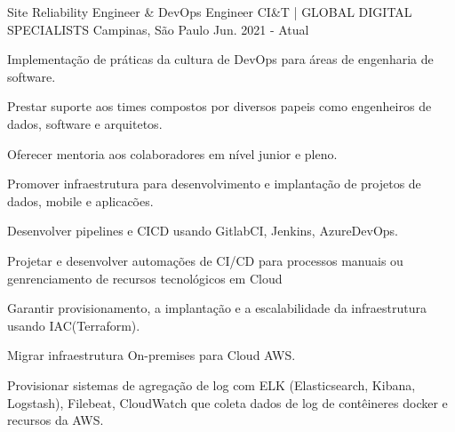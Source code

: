 

\begin{cventries}

  \cventry
    {Site Reliability Engineer \& DevOps Engineer} %
    {CI\&T | GLOBAL DIGITAL SPECIALISTS} %
    {Campinas, São Paulo} %
    {Jun. 2021 - Atual} %
    {
      \begin{cvitems} %
        \item {Implementação de práticas da cultura de DevOps para áreas de engenharia de software.}
        \item {Prestar suporte aos times compostos por diversos papeis como engenheiros de dados, software e arquitetos.}
        \item {Oferecer mentoria aos colaboradores em nível junior e pleno.}
        \item {Promover infraestrutura para desenvolvimento e implantação de projetos de dados, mobile e aplicacões.}
        \item {Desenvolver pipelines e CICD usando GitlabCI, Jenkins, AzureDevOps.}
        \item {Projetar e desenvolver automações de CI/CD para processos manuais ou genrenciamento de recursos tecnológicos em Cloud}
        \item {Garantir provisionamento, a implantação e a escalabilidade da infraestrutura usando IAC(Terraform).}
        \item {Migrar infraestrutura On-premises para Cloud AWS.}
        \item {Provisionar sistemas de agregação de log com ELK (Elasticsearch, Kibana, Logstash), Filebeat, CloudWatch que coleta dados de log de contêineres docker e recursos da AWS.}
      \end{cvitems}
    }
  \break


\end{cventries}
